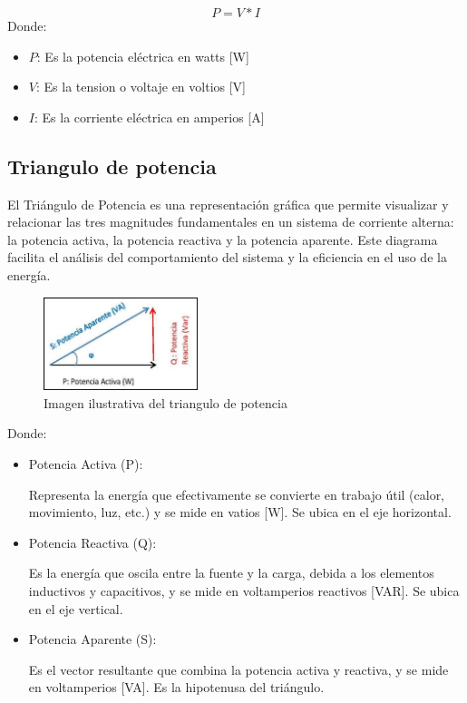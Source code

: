 \documentclass{report}          %
\begin{document}
            \begin{equation}
                P=V*I
            \end{equation}
            Donde:
            \begin{itemize}
                \item $P$: Es la potencia eléctrica en watts [W]
                \item $V$: Es la tension o voltaje en voltios [V]
                \item $I$: Es la corriente eléctrica en amperios [A]
            \end{itemize}

            \subsection{Triangulo de potencia}
            El Triángulo de Potencia es una representación gráfica que permite visualizar y relacionar las tres magnitudes fundamentales en un sistema de corriente alterna: la potencia activa, la potencia reactiva y la potencia aparente. Este diagrama facilita el análisis del comportamiento del sistema y la eficiencia en el uso de la energía.\par

            \begin{figure}[H]
                \label{fig:DiagramaEje}
                \centering
                \includegraphics[width=0.4\textwidth] {Recursos/Imagenes/Marco_teorico/Triangulo_de_potencia.png}
                \caption{Imagen ilustrativa del triangulo de potencia}
            \end{figure}

            Donde:
            \begin{itemize}
                \item Potencia Activa (P): \par
                    Representa la energía que efectivamente se convierte en trabajo útil (calor, movimiento, luz, etc.) y se mide en vatios [W]. Se ubica en el eje horizontal.
                \item Potencia Reactiva (Q):\par
                    Es la energía que oscila entre la fuente y la carga, debida a los elementos inductivos y capacitivos, y se mide en voltamperios reactivos [VAR]. Se ubica en el eje vertical.
                \item Potencia Aparente (S): \par
                    Es el vector resultante que combina la potencia activa y reactiva, y se mide en voltamperios [VA]. Es la hipotenusa del triángulo.
            \end{itemize}
\end{document}
